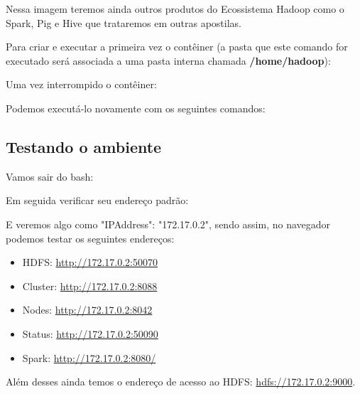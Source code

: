 \documentclass[a4paper,11pt]{article}
\begin{document}
Nessa imagem teremos ainda outros produtos do Ecossistema Hadoop como o Spark, Pig e Hive que trataremos em outras apostilas.

Para criar e executar a primeira vez o contêiner (a pasta que este comando for executado será associada a uma pasta interna chamada \textbf{/home/hadoop}): \\

Uma vez interrompido o contêiner: \\

Podemos executá-lo novamente com os seguintes comandos: \\

\subsection{Testando o ambiente}
Vamos sair do bash: \\

Em seguida verificar seu endereço padrão: \\

E veremos algo como "IPAddress": "172.17.0.2", sendo assim, no navegador podemos testar os seguintes endereços: \vspace{-1em}
\begin{itemize}
	\item HDFS: \url{http://172.17.0.2:50070}
	\item Cluster: \url{http://172.17.0.2:8088}
	\item Nodes: \url{http://172.17.0.2:8042}
	\item Status: \url{http://172.17.0.2:50090}
	\item Spark: \url{http://172.17.0.2:8080/}
\end{itemize}
Além desses ainda temos o endereço de acesso ao HDFS: \url{hdfs://172.17.0.2:9000}.
\end{document}
